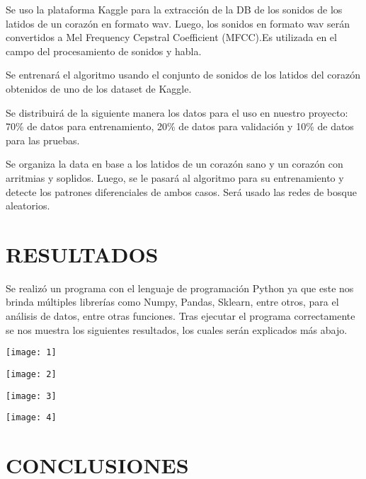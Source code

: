 \documentclass[conference]{IEEEtran}
\begin{document}
Se uso la plataforma Kaggle para la extracción de la DB de los sonidos de los latidos de un corazón en formato wav. Luego, los sonidos en formato wav serán convertidos a Mel Frequency Cepstral Coefficient (MFCC).Es utilizada en el campo del procesamiento de sonidos y habla.

Se entrenará el algoritmo usando el conjunto de sonidos de los latidos del corazón obtenidos de uno de los dataset de Kaggle. 

Se distribuirá de la siguiente manera los datos para el uso en nuestro proyecto: 70\% de datos para entrenamiento, 20\% de datos para validación y 10\% de datos para las pruebas.

Se organiza la data en base a los latidos de un corazón sano y  un corazón con arritmias y soplidos. Luego, se le pasará al algoritmo para su entrenamiento y detecte los patrones diferenciales de ambos casos. Será usado las redes de bosque aleatorios.

\section{RESULTADOS}

Se realizó un programa con el lenguaje de programación Python ya que este nos brinda múltiples librerías como Numpy, Pandas, Sklearn, entre otros, para el análisis de datos, entre otras funciones. Tras ejecutar el programa correctamente se nos muestra los siguientes resultados, los cuales serán explicados más abajo.


\texttt{[image: 1]}

\texttt{[image: 2]}

\texttt{[image: 3]}

\texttt{[image: 4]}



\section{CONCLUSIONES}
\end{document}
